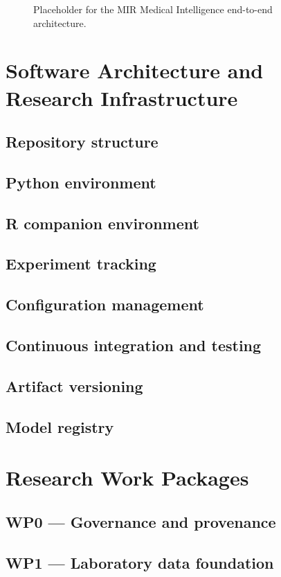 \documentclass[11pt,journal,onecolumn,draftclsnofoot]{IEEEtran}
\begin{document}
\begin{figure}[H]
    \centering
    \fbox{\rule{0pt}{2.0in}\rule{0.95\linewidth}{0pt}}
    \caption{Placeholder for the MIR Medical Intelligence end-to-end architecture.}
    \label{fig:architecture}
\end{figure}

\section{Software Architecture and Research Infrastructure}
\subsection{Repository structure}
\subsection{Python environment}
\subsection{R companion environment}
\subsection{Experiment tracking}
\subsection{Configuration management}
\subsection{Continuous integration and testing}
\subsection{Artifact versioning}
\subsection{Model registry}

\section{Research Work Packages}
\subsection{WP0 --- Governance and provenance}
\subsection{WP1 --- Laboratory data foundation}
\end{document}

